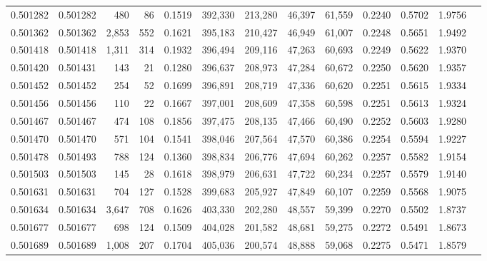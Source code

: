 \begin{tabular}{rrrrrrrrrrrrr}
0.501282 & 0.501282 &   480 &    86 &                                     0.1519 & 392,330 & 213,280 &  46,397 &  61,559 & 0.2240 & 0.5702 & 1.9756 \\
0.501362 & 0.501362 & 2,853 &   552 &                                     0.1621 & 395,183 & 210,427 &  46,949 &  61,007 & 0.2248 & 0.5651 & 1.9492 \\
0.501418 & 0.501418 & 1,311 &   314 &                                     0.1932 & 396,494 & 209,116 &  47,263 &  60,693 & 0.2249 & 0.5622 & 1.9370 \\
0.501420 & 0.501431 &   143 &    21 &                                     0.1280 & 396,637 & 208,973 &  47,284 &  60,672 & 0.2250 & 0.5620 & 1.9357 \\
0.501452 & 0.501452 &   254 &    52 &                                     0.1699 & 396,891 & 208,719 &  47,336 &  60,620 & 0.2251 & 0.5615 & 1.9334 \\
0.501456 & 0.501456 &   110 &    22 &                                     0.1667 & 397,001 & 208,609 &  47,358 &  60,598 & 0.2251 & 0.5613 & 1.9324 \\
0.501467 & 0.501467 &   474 &   108 &                                     0.1856 & 397,475 & 208,135 &  47,466 &  60,490 & 0.2252 & 0.5603 & 1.9280 \\
0.501470 & 0.501470 &   571 &   104 &                                     0.1541 & 398,046 & 207,564 &  47,570 &  60,386 & 0.2254 & 0.5594 & 1.9227 \\
0.501478 & 0.501493 &   788 &   124 &                                     0.1360 & 398,834 & 206,776 &  47,694 &  60,262 & 0.2257 & 0.5582 & 1.9154 \\
0.501503 & 0.501503 &   145 &    28 &                                     0.1618 & 398,979 & 206,631 &  47,722 &  60,234 & 0.2257 & 0.5579 & 1.9140 \\
0.501631 & 0.501631 &   704 &   127 &                                     0.1528 & 399,683 & 205,927 &  47,849 &  60,107 & 0.2259 & 0.5568 & 1.9075 \\
0.501634 & 0.501634 & 3,647 &   708 &                                     0.1626 & 403,330 & 202,280 &  48,557 &  59,399 & 0.2270 & 0.5502 & 1.8737 \\
0.501677 & 0.501677 &   698 &   124 &                                     0.1509 & 404,028 & 201,582 &  48,681 &  59,275 & 0.2272 & 0.5491 & 1.8673 \\
0.501689 & 0.501689 & 1,008 &   207 &                                     0.1704 & 405,036 & 200,574 &  48,888 &  59,068 & 0.2275 & 0.5471 & 1.8579 \\

\end{tabular}
